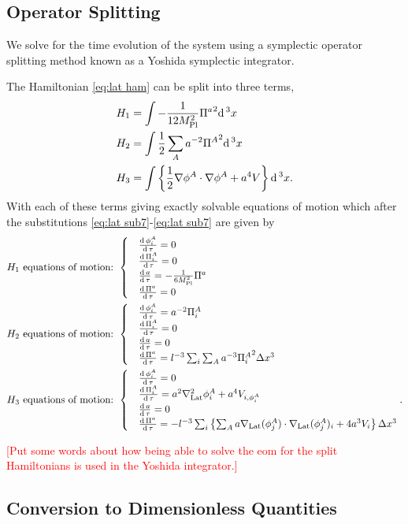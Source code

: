 \subsection{Operator Splitting}
We solve for the time evolution of the system using a symplectic operator splitting method known as a Yoshida symplectic integrator.

The Hamiltonian \eqref{eq:lat ham} can be split into three terms,
\begin{align} 
  & H_1 = \int-\frac{1}{12M_{\mathrm{Pl}}^2}{\Pi^a}^2\mathrm{d}\,^3x  \label{eq:ham split1}  \\
  & H_2 = \int\frac{1}{2}\sum_Aa^{-2}{\Pi^A}^2\mathrm{d}\,^3x  \label{eq:ham split2}  \\
  & H_3 = \int\left\{\frac{1}{2}\nabla\phi^A\cdot\nabla\phi^A + a^4V\right\}\mathrm{d}\,^3x. \label{eq:ham split3}
\end{align}
With each of these terms giving exactly solvable equations of motion which after the substitutions \eqref{eq:lat sub7}-\eqref{eq:lat sub7} are given by
\begin{align}
  H_1 \text{ equations of motion: }
  & \begin{cases}
      & \frac{\mathrm{d}\,\phi^A_i}{\mathrm{d}\,\tau} = 0 \\
      & \frac{\mathrm{d}\,\Pi^A_i}{\mathrm{d}\,\tau} = 0 \\
      & \frac{\mathrm{d}\, a}{\mathrm{d}\,\tau} = -\frac{1}{6M_{\mathrm{Pl}}^2}\Pi^a \\
      & \frac{\mathrm{d}\,\Pi^a}{\mathrm{d}\,\tau} = 0
    \end{cases} \\
  H_2 \text{ equations of motion: }
  & \begin{cases}
      & \frac{\mathrm{d}\,\phi^A_i}{\mathrm{d}\,\tau} = a^{-2}\Pi^A_i \\
      & \frac{\mathrm{d}\,\Pi^A_i}{\mathrm{d}\,\tau} = 0 \\
      & \frac{\mathrm{d}\, a}{\mathrm{d}\,\tau} = 0 \\
      & \frac{\mathrm{d}\,\Pi^a}{\mathrm{d}\,\tau} = l^{-3}\sum_i\sum_Aa^{-3}{\Pi^A_i}^2\Delta x^3
    \end{cases} \\
  H_3 \text{ equations of motion: }
  & \begin{cases}
      & \frac{\mathrm{d}\,\phi^A_i}{\mathrm{d}\,\tau} = 0 \\
      & \frac{\mathrm{d}\,\Pi^A_i}{\mathrm{d}\,\tau} = a^2\nabla^2_{\mathrm{Lat}}\phi^A_i + a^4V_{i,\phi^A_i} \\
      & \frac{\mathrm{d}\, a}{\mathrm{d}\,\tau} = 0 \\
      & \frac{\mathrm{d}\,\Pi^a}{\mathrm{d}\,\tau} = -l^{-3}\sum_i\left\{
      \sum_Aa\nabla_{\mathrm{Lat}}(\phi^A_j)\cdot\nabla_{\mathrm{Lat}}(\phi^A_j)_i +4a^3V_i
      \right\}\Delta x^3
    \end{cases}.
\end{align}

\textcolor{red}{[Put some words about how being able to solve the eom for the split Hamiltonians is used in the Yoshida integrator.]}

\subsection{Conversion to Dimensionless Quantities}
